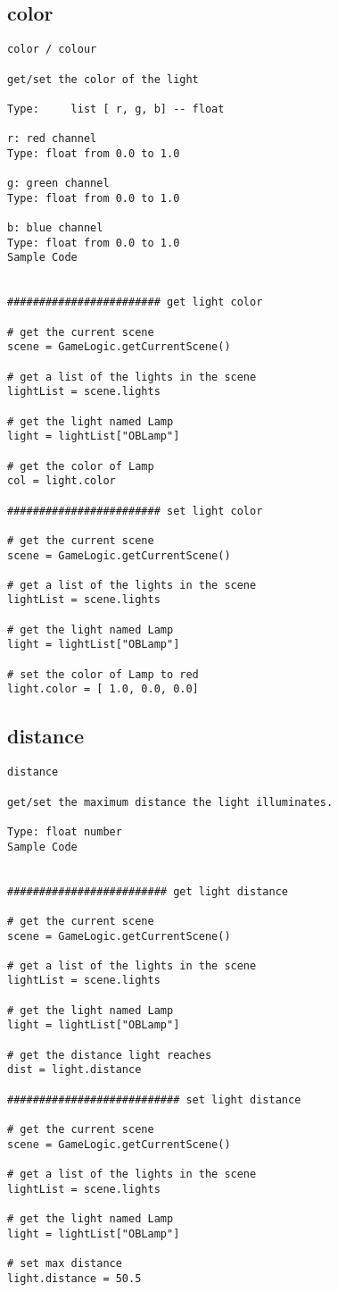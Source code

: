 \subsection{color}
\begin{verbatim}
color / colour

get/set the color of the light

Type:     list [ r, g, b] -- float

r: red channel
Type: float from 0.0 to 1.0

g: green channel
Type: float from 0.0 to 1.0

b: blue channel
Type: float from 0.0 to 1.0
Sample Code


######################## get light color

# get the current scene
scene = GameLogic.getCurrentScene()

# get a list of the lights in the scene
lightList = scene.lights

# get the light named Lamp
light = lightList["OBLamp"]

# get the color of Lamp
col = light.color

######################## set light color

# get the current scene
scene = GameLogic.getCurrentScene()

# get a list of the lights in the scene
lightList = scene.lights

# get the light named Lamp
light = lightList["OBLamp"]

# set the color of Lamp to red
light.color = [ 1.0, 0.0, 0.0]
\end{verbatim}

\subsection{distance}
\begin{verbatim}
distance

get/set the maximum distance the light illuminates.

Type: float number
Sample Code


######################### get light distance

# get the current scene
scene = GameLogic.getCurrentScene()

# get a list of the lights in the scene
lightList = scene.lights

# get the light named Lamp
light = lightList["OBLamp"]

# get the distance light reaches
dist = light.distance

########################### set light distance

# get the current scene
scene = GameLogic.getCurrentScene()

# get a list of the lights in the scene
lightList = scene.lights

# get the light named Lamp
light = lightList["OBLamp"]

# set max distance
light.distance = 50.5
\end{verbatim}

